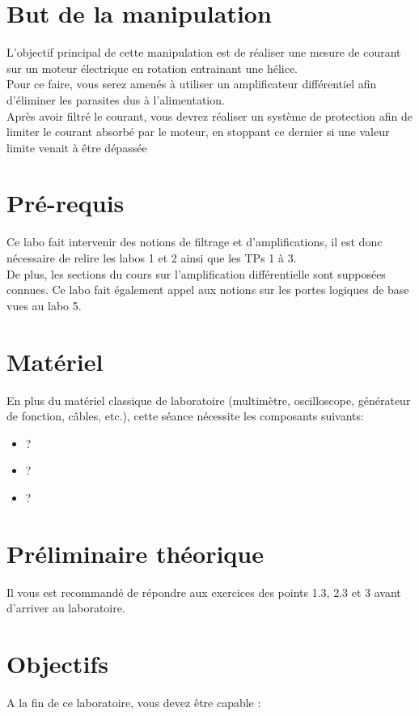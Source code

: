 \documentclass{../template/tp}
\author{The Fantastic Four} %
\begin{document}

\section{But de la manipulation}

L'objectif principal de cette manipulation est de réaliser une mesure de courant sur un moteur
électrique en rotation entrainant une hélice.\\
Pour ce faire, vous serez amenés à utiliser un amplificateur différentiel afin d'éliminer les parasites
dus à l'alimentation.\\
Après avoir filtré le courant, vous devrez réaliser un système de protection afin de limiter le courant
absorbé par le moteur, en stoppant ce dernier si une valeur limite venait à être dépassée

\section{Pré-requis}
Ce labo fait intervenir des notions de filtrage et d'amplifications, il est donc nécessaire de relire les
labos 1 et 2 ainsi que les TPs 1 à 3.\\
De plus, les sections du cours sur l'amplification différentielle sont supposées connues. Ce labo fait
également appel aux notions sur les portes logiques de base vues au labo 5.

\section{Matériel}
En plus du matériel classique de laboratoire (multimètre, oscilloscope, générateur de fonction, câbles, etc.), cette séance nécessite les composants suivants:
\begin{itemize}
\item ? %
\item ?
\item ?
\end{itemize}

\newpage
\section{Préliminaire théorique} %
Il vous est recommandé de répondre aux exercices des points 1.3, 2.3 et 3 avant d'arriver au
laboratoire.

\section{Objectifs}
A la fin de ce laboratoire, vous devez être capable :
\end{document}
